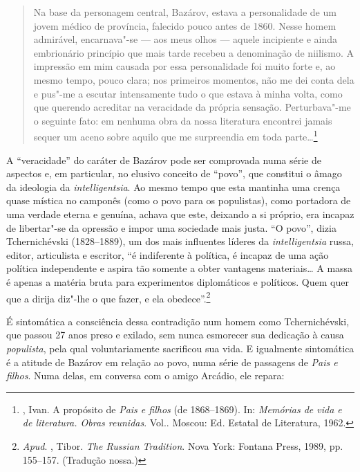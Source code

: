 \begin{quotation}
Na base da personagem central, Bazárov, estava a personalidade de um
jovem médico de província, falecido pouco antes de 1860. Nesse homem
admirável, encarnava"-se --- aos meus olhos --- aquele incipiente e ainda
embrionário princípio que mais tarde recebeu a denominação de niilismo.
A impressão em mim causada por essa personalidade foi muito forte e, ao
mesmo tempo, pouco clara; nos primeiros momentos, não me dei conta dela
e pus"-me a escutar intensamente tudo o que estava à minha volta, como
que querendo acreditar na veracidade da própria sensação. Perturbava"-me
o seguinte fato: em nenhuma obra da nossa literatura encontrei jamais
sequer um aceno sobre aquilo que me surpreendia em toda parte\ldots{}\footnote{, Ivan. A propósito de \emph{Pais e filhos} (de 1868--1869). In: \emph{Memórias de vida e de literatura. Obras reunidas}. Vol.. Moscou: Ed. Estatal de Literatura, 1962.} 
\end{quotation}

A ``veracidade'' do caráter de Bazárov pode ser comprovada numa série de
aspectos e, em particular, no elusivo conceito de ``povo'', que constitui
o âmago da ideologia da \emph{intelligentsia}. Ao mesmo tempo que esta
mantinha uma crença quase mística no camponês (como o povo para os
populistas), como portadora de uma verdade eterna e genuína, achava que
este, deixando a si próprio, era incapaz de libertar"-se da opressão e
impor uma sociedade mais justa. ``O povo'', dizia Tchernichévski (1828--1889), um dos
mais influentes líderes da \emph{intelligentsia} russa, editor,
articulista e escritor, ``é indiferente à política, é incapaz de uma
ação política independente e aspira tão somente a obter vantagens
materiais\ldots{} A massa é apenas a matéria bruta para experimentos diplomáticos e
políticos. Quem quer que a dirija diz"-lhe o que fazer, e ela obedece''.\footnote{\emph{Apud}. , Tibor. \emph{The Russian Tradition}. Nova York: Fontana Press, 1989, pp. 155--157. (Tradução nossa.)}

É sintomática a consciência dessa contradição num homem como
Tchernichévski, que passou 27 anos preso e exilado, sem nunca esmorecer
sua dedicação à causa \emph{populista}, pela qual voluntariamente sacrificou sua
vida. E igualmente sintomática é a atitude de Bazárov em relação ao povo, numa
série de passagens de \emph{Pais e filhos}. Numa delas, em conversa com o amigo Arcádio, ele
repara:


